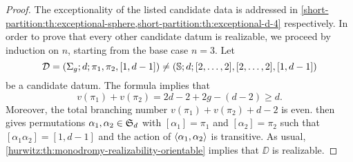 \begin{proof}
The exceptionality of the listed candidate data is addressed in \cref{short-partition:th:exceptional-sphere,short-partition:th:exceptional-d-4} respectively. In order to prove that every other candidate datum is realizable, we proceed by induction on $n$, starting from the base case $n=3$. Let
\[
\mathcal{D}=(\Sigma_{g};d;\pi_1,\pi_2,[1,d-1])\neq(\mathbb{S}{};d;[2,\ldots,2],[2,\ldots,2],[1,d-1])
\]
be a candidate datum. The \RH{} formula implies that
\[
v(\pi_1)+v(\pi_2)=2d-2+2g-(d-2)\ge d.
\]
Moreover, the total branching number $v(\pi_1)+v(\pi_2)+d-2$ is even.  then gives permutations $\alpha_1,\alpha_2\in\symgroup[d]$ with $[\alpha_1]=\pi_1$ and $[\alpha_2]=\pi_2$ such that $[\alpha_1\alpha_2]=[1,d-1]$ and the action of $\left\langle\alpha_1,\alpha_2\right\rangle$ is transitive. As usual, \cref{hurwitz:th:monodromy-realizability-orientable} implies that $\DD$ is realizable.


\end{proof}
